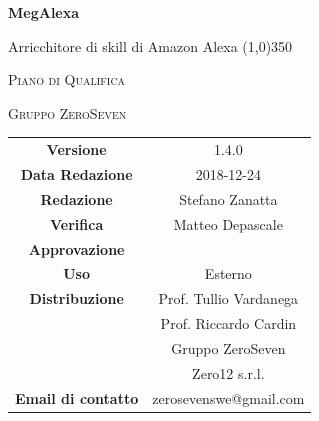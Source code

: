 \documentclass[a4paper,12pt]{book}
\author{Stefano Zanatta}
\date{2018-12-24}
\begin{document}
\begin{titlepage}
	\centering
	{\huge\bfseries MegAlexa\par}
	Arricchitore di skill di Amazon Alexa
	\line(1,0){350} \\
	{\scshape\LARGE Piano di Qualifica \par}
	\vspace{1cm}
	{\scshape Gruppo ZeroSeven \par}
	\logo
	\begin{tabular}{c|c}
		{\hfill \textbf{Versione}} 			& 1.4.0				\\
		{\hfill\textbf{Data Redazione}} 	& 2018-12-24		\\ 
		{\hfill\textbf{Redazione}} 			&  Stefano Zanatta \\
	{\hfill\textbf{Verifica}} 				&  	Matteo Depascale			\\ 
		{\hfill\textbf{Approvazione}} 		&  					\\ 
	{\hfill\textbf{Uso}} 					& 		Esterno		\\ 
	{\hfill\textbf{Distribuzione}} 			& 			Prof. Tullio Vardanega \\ & Prof. Riccardo Cardin \\ & Gruppo ZeroSeven		\\ & Zero12 s.r.l. \\
		{\hfill\textbf{Email di contatto}} & zerosevenswe@gmail.com \\
	\end{tabular}
\end{titlepage}
	

	
	\label{LastFrontPage}
	\newpage	
	
	\pagestyle{mymain}
	\tableofcontents
	\listoftables
	
	
	

	\begin{appendices}
		
		
	\end{appendices}

			
	\label{LastPage}
\end{document}
